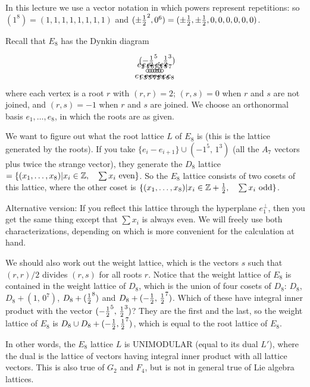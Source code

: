  \setcounter{lecture}{25}

In this lecture we use a vector notation in which powers represent repetitions:  so
$(1^8)=(1,1,1,1,1,1,1,1)$ and $(\pm \frac{1}{2}^2 , 0^6)=(\pm \frac{1}{2}, \pm \frac{1}{2},
0,0,0,0,0,0)$.

  Recall that $E_8$ has the Dynkin diagram
 \[\begin{xy}
   (0,0) *+!U{e_1-e_2} *\cir<2pt>{};
   (1,0) *+!D{e_2-e_3} *\cir<2pt>{} **@{-};
   p+(1,0) *+!U{e_3-e_4} *\cir<2pt>{} **@{-};
   p+(1,0) *+!D{e_4-e_5} *\cir<2pt>{} **@{-};
   p+(1,0) *+!U{e_5-e_6} *\cir<2pt>{} **@{-};
   p+(0,1) *+!D{(-\half^5 , \, \half^3)} *\cir<2pt>{} **@{-},
   p+(1,0) *+!D{e_6-e_7} *\cir<2pt>{} **@{-};
   p+(1,0) *+!U{e_7-e_8} *\cir<2pt>{} **@{-};
 \end{xy} \]
  where each vertex is a root $r$ with $(r,r)=2$; $(r,s)=0$ when $r$ and $s$ are
  not joined, and $(r,s)=-1$ when $r$ and $s$ are joined. We choose an orthonormal basis
   $e_1,\dots, e_8$, in which the roots are as given.

  We want to figure out what the root lattice $L$ of $E_8$ is (this is the lattice
  generated by the roots). If you take $\{e_i-e_{i+1}\} \cup (-1^5 , \, 1^3)$ (all the
  $A_7$ vectors plus twice the strange vector), they generate the $D_8$ lattice
  $=\{(x_1,\dots, x_8)|x_i\in \mathbb{Z}, \quad \sum x_i \text{ even}\}$. So the $E_8$
  lattice consists of two cosets of this lattice, where the other coset is
  $\{(x_1,\dots, x_8)|x_i\in \mathbb{Z}+\frac{1}{2},\quad \sum x_i\text{ odd}\}$.

  Alternative version: If you reflect this lattice through the hyperplane $e_1^\perp$,
  then you get the same thing except that $\sum x_i$ is always even.  We will freely
  use both characterizations, depending on which is more convenient for the
  calculation at hand.

  We should also work out the weight lattice, which is the vectors $s$ such that
  $(r,r)/2$ divides $(r,s)$ for all roots $r$. Notice that the weight lattice of $E_8$
  is contained in the weight lattice of $D_8$, which is the union of four cosets of
  $D_8$:  $D_8$, $D_8+(1 , \, 0^7)$, $D_8+(\frac{1}{2}^8)$ and $ D_8+(-\frac{1}{2}, \, \frac{1}{2}^7)$.
  Which of these have integral inner product with the vector $(-\frac{1}{2}^5 , \,
  \frac{1}{2}^3)$? They are the first and the last, so the weight lattice of $E_8$ is
  $D_8\cup D_8+(-\frac{1}{2}, \frac{1}{2}^7)$, which is equal to the root lattice of $E_8$.

  In other words, the $E_8$ lattice $L$ is UNIMODULAR (equal to its dual $L'$), where
  the dual is the lattice of vectors having integral inner product with all lattice
  vectors.  This is also true of $G_2$ and $F_4$, but is not in general true of Lie
  algebra lattices.

